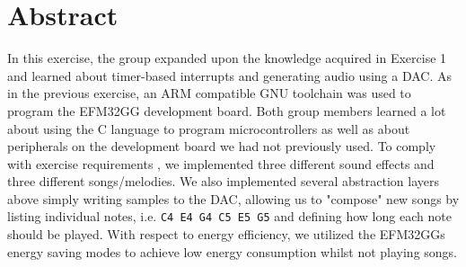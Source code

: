 \chapter*{Abstract}


In this exercise, the group expanded upon the knowledge acquired in Exercise 1 \cite{exercise1report} and learned about timer-based interrupts and generating audio using a DAC. As in the previous exercise, an ARM compatible GNU toolchain was used to program the EFM32GG development board. Both group members learned a lot about using the C language to program microcontrollers as well as about peripherals on the development board we had not previously used. To comply with exercise requirements \cite[p.~42]{compendium}, we implemented three different sound effects and three different songs/melodies. We also implemented several abstraction layers above simply writing samples to the DAC, allowing us to "compose" new songs by listing individual notes, i.e. \texttt{C4 E4 G4 C5 E5 G5} and defining how long each note should be played. With respect to energy efficiency, we utilized the EFM32GGs energy saving modes to achieve low energy consumption whilst not playing songs.

